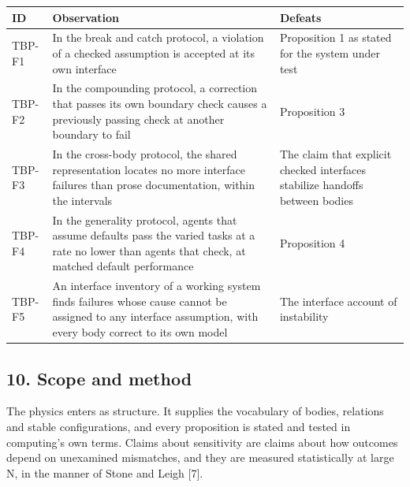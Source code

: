 \documentclass[
  10pt,
]{article}
\newcounter{none} %
\begin{document}
{\def\LTcaptype{none} %
\begin{longtable}[]{@{}
  >{\raggedright\arraybackslash}p{}
  >{\raggedright\arraybackslash}p{}
  >{\raggedright\arraybackslash}p{}@{}}
\toprule\noalign{}
\begin{minipage}[b]{\linewidth}\raggedright
ID
\end{minipage} & \begin{minipage}[b]{\linewidth}\raggedright
Observation
\end{minipage} & \begin{minipage}[b]{\linewidth}\raggedright
Defeats
\end{minipage} \\
\midrule\noalign{}
\endhead
\bottomrule\noalign{}
\endlastfoot
TBP-F1 & In the break and catch protocol, a violation of a checked
assumption is accepted at its own interface & Proposition 1 as stated
for the system under test \\
TBP-F2 & In the compounding protocol, a correction that passes its own
boundary check causes a previously passing check at another boundary to
fail & Proposition 3 \\
TBP-F3 & In the cross-body protocol, the shared representation locates
no more interface failures than prose documentation, within the
intervals & The claim that explicit checked interfaces stabilize
handoffs between bodies \\
TBP-F4 & In the generality protocol, agents that assume defaults pass
the varied tasks at a rate no lower than agents that check, at matched
default performance & Proposition 4 \\
TBP-F5 & An interface inventory of a working system finds failures whose
cause cannot be assigned to any interface assumption, with every body
correct to its own model & The interface account of instability \\
\end{longtable}
}

\subsection{10. Scope and method}\label{scope-and-method}

The physics enters as structure. It supplies the vocabulary of bodies,
relations and stable configurations, and every proposition is stated and
tested in computing's own terms. Claims about sensitivity are claims
about how outcomes depend on unexamined mismatches, and they are
measured statistically at large N, in the manner of Stone and Leigh
{[}7{]}.
\end{document}
